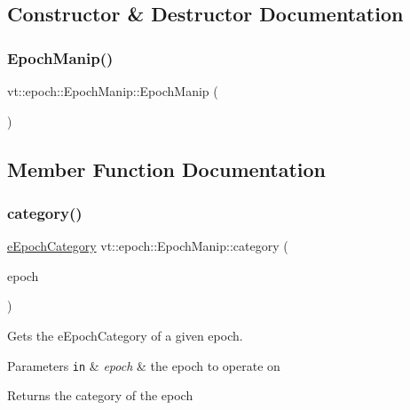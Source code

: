 \subsection{Constructor \& Destructor Documentation}
\mbox{\label{structvt_1_1epoch_1_1_epoch_manip_a8dd8d684917d7b17f726512920955b43}} 
\subsubsection{\texorpdfstring{Epoch\+Manip()}{EpochManip()}}
{\footnotesize\ttfamily vt\+::epoch\+::\+Epoch\+Manip\+::\+Epoch\+Manip (\begin{DoxyParamCaption}{ }\end{DoxyParamCaption})}



\subsection{Member Function Documentation}
\mbox{\label{structvt_1_1epoch_1_1_epoch_manip_aa61d47033545df147c01036211c4cabe}} 
\subsubsection{\texorpdfstring{category()}{category()}}
{\footnotesize\ttfamily \hyperlink{namespacevt_1_1epoch_a956abe0aceef0d10a988de8acb002c7c}{e\+Epoch\+Category} vt\+::epoch\+::\+Epoch\+Manip\+::category (\begin{DoxyParamCaption}\item[{\hyperlink{namespacevt_a985a5adf291c34a3ca263b3378388236}{Epoch\+Type} const \&}]{epoch }\end{DoxyParamCaption})\hspace{0.3cm}{\ttfamily [static]}}



Gets the {\ttfamily e\+Epoch\+Category} of a given epoch. 


\begin{DoxyParams}[1]{Parameters}
\mbox{\tt in}  & {\em epoch} & the epoch to operate on\\
\hline
\end{DoxyParams}
\begin{DoxyReturn}{Returns}
the category of the {\ttfamily epoch} 
\end{DoxyReturn}
\mbox{\label{structvt_1_1epoch_1_1_epoch_manip_a6e96213acd8e0a160a4d4b9ab6a64eaf}} 
